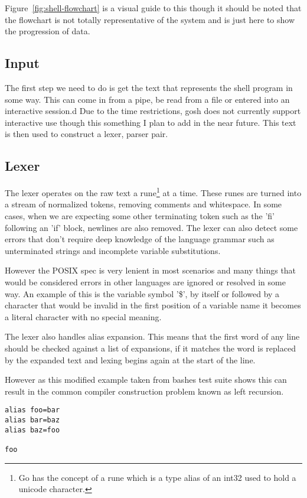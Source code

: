 Figure~\ref{fig:shell-flowchart} is a visual guide to this though it should be noted that the flowchart is not totally representative of the system and is just here to show the progression of data.


\subsection{Input}
The first step we need to do is get the text that represents the shell program in some way.
This can come in from a pipe, be read from a file or entered into an interactive session.d
Due to the time restrictions, gosh does not currently support interactive use though this something I plan to add in the near future.
This text is then used to construct a lexer, parser pair.

\subsection{Lexer}
The lexer operates on the raw text a rune\footnote{Go has the concept of a rune which is a type alias of an int32 used to hold a unicode character.} at a time.
These runes are turned into a stream of normalized tokens, removing comments and whitespace.
In some cases, when we are expecting some other terminating token such as the 'fi' following an 'if' block, newlines are also removed.
The lexer can also detect some errors that don't require deep knowledge of the language grammar such as unterminated strings and incomplete variable substitutions. 

However the POSIX spec is very lenient in most scenarios and many things that would be considered errors in other languages are ignored or resolved in some way.
An example of this is the variable symbol '\$', by itself or followed by a character that would be invalid in the first position of a variable name it becomes a literal character with no special meaning.

The lexer also handles alias expansion.
This means that the first word of any line should be checked against a list of expansions, if it matches the word is replaced by the expanded text and lexing begins again at the start of the line.

However as this modified example taken from bashes test suite shows this can result in the common compiler construction problem known as left recursion.
\begin{verbatim}
alias foo=bar
alias bar=baz
alias baz=foo

foo
\end{verbatim}

